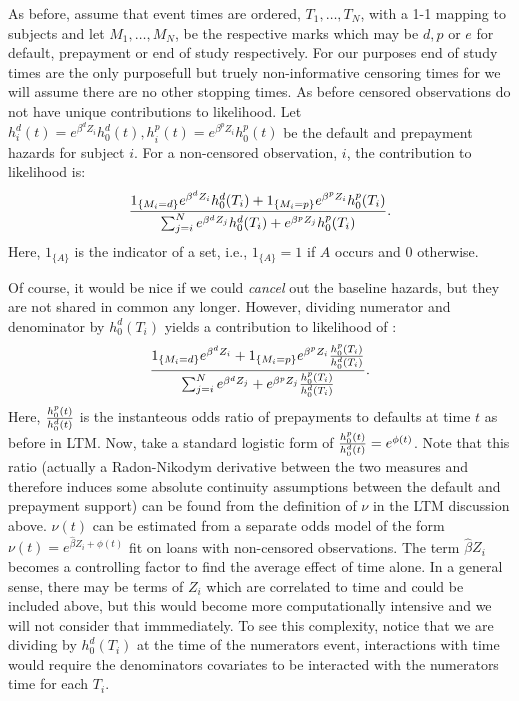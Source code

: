 \documentclass[10pt]{article}
\begin{document}
As before, assume that event times are ordered, $T_1, \ldots, T_N$, with a 1-1 mapping to subjects and let $M_1, \ldots, M_N$, be the respective marks which 
may be $d, p$ or $e$ for default, prepayment or end of study respectively.  For our purposes end of study times are the only purposefull but truely non-informative 
censoring times for we will assume there are no other stopping times.  As before censored observations do not have unique contributions to likelihood.  Let 
$h^d_i(t)=e^{\beta^d Z_i}h^d_0(t), h^p_i(t)=e^{\beta^p Z_i}h^p_0(t)$ be the default and prepayment hazards for subject $i$.
For a non-censored observation, $i$, the contribution to likelihood is:
$$ {{1_{\{M_i=d\}}e^{\beta^d Z_i}h^d_0(T_i)+1_{\{M_i=p\}}e^{\beta^p Z_i}h^p_0(T_i) } 
\over { \sum_{j=i}^N e^{\beta^d Z_j}h^d_0(T_i)+e^{\beta^p Z_j}h^p_0(T_i) } }.$$
Here, $1_{\{A\}}$ is the indicator of a set, i.e., $1_{\{A\}}=1$ if $A$ occurs and 0 otherwise.

Of course, it would be nice if we could {\em cancel} out the baseline hazards, but they are not shared in common any longer.  However, dividing numerator and 
denominator by $h^d_0(T_i)$ yields a contribution to likelihood of :
$$ {{1_{\{M_i=d\}}e^{\beta^d Z_i}+1_{\{M_i=p\}}e^{\beta^p Z_i}{h^p_0(T_i)\over h^d_0(T_i)} } 
\over { \sum_{j=i}^N e^{\beta^d Z_j}+e^{\beta^p Z_j}{h^p_0(T_i)\over h^d_0(T_i)} } }.$$
Here, ${h^p_0(t)\over h^d_0(t)}$ is the instanteous odds ratio of prepayments to defaults at time $t$ as before in LTM.  Now, take a standard logistic form of 
${h^p_0(t)\over h^d_0(t)}={e^{\phi(t)}}$. Note that this ratio (actually a Radon-Nikodym derivative between the two measures and therefore induces some 
absolute continuity assumptions between the default and prepayment support) can be found from the definition of $\nu$ in the LTM discussion above.  
$\nu(t)$ can be estimated from a separate odds model of the form $\nu(t)=e^{\hat{\beta}Z_i+\phi(t)}$ fit on loans with non-censored observations.  The 
term ${\hat{\beta}Z_i}$ becomes a controlling factor to find the average effect of time alone.  In a general sense, there may be terms of $Z_i$ which are 
correlated to time and could be included above, but this would become more computationally intensive and we will not consider that immmediately. To see this 
complexity, notice that we are dividing by $h^d_0(T_i)$ at the time of the numerators event, interactions with time would require the denominators covariates
to be interacted with the numerators time for each $T_i$.  
\end{document}
